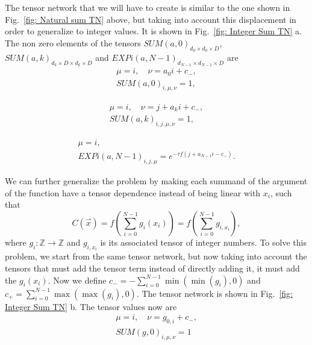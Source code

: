 The tensor network that we will have to create is similar to the one shown in Fig.~\ref{fig: Natural sum TN} above, but taking into account this displacement in order to generalize to integer values. It is shown in Fig.~\ref{fig: Integer Sum TN} a. The non zero elements of the tensors $SUM(a,0)_{d_0\times d_0 \times D}$, $SUM(a,k)_{d_k\times D \times d_k \times D}$ and $EXPi(a,N-1)_{d_{N-1}\times d_{N-1}\times D}$ are
\begin{equation}
     \begin{gathered}
         \mu=i,\quad \nu=a_0 i+c_-,\\
         SUM(a,0)_{i,\mu,\nu} = 1,
     \end{gathered}
\end{equation}

\begin{equation}
     \begin{gathered}
         \mu=i,\quad \nu=j+a_k i+c_-,\\
         SUM(a,k)_{i,j,\mu,\nu} = 1,
     \end{gathered}
\end{equation}

\begin{equation}
     \begin{gathered}
         \mu=i,\\
         EXPi(a,N-1)_{i,j,\mu} = e^{-\tau f(j+a_{N-1}i-c_-)}.
     \end{gathered}
\end{equation}

We can further generalize the problem by making each summand of the argument of the function have a tensor dependence instead of being linear with $x_i$, such that
\begin{equation}
    C(\vec{x})=f\left(\sum_{i=0}^{N-1} g_i(x_i)\right) = f\left(\sum_{i=0}^{N-1} g_{i,x_i}\right),
\end{equation}
where $g_i: \mathbb{Z}\rightarrow \mathbb{Z}$ and $g_{i,x_i}$ is its associated tensor of integer numbers. To solve this problem, we start from the same tensor network, but now taking into account the tensors that must add the tensor term instead of directly adding it, it must add the $g_i(x_i)$. Now we define  $c_-=-\sum_{i=0}^{N-1} \min(\min(g_i),0)$ and $c_+=\sum_{i=0}^{N-1} \max(\max(g_i),0)$. The tensor network is shown in Fig.~\ref{fig: Integer Sum TN} b. The tensor values now are
\begin{equation}
     \begin{gathered}
         \mu=i,\quad \nu=g_{0,i}+c_-,\\
         SUM(g,0)_{i,\mu,\nu} = 1
     \end{gathered}
\end{equation}

